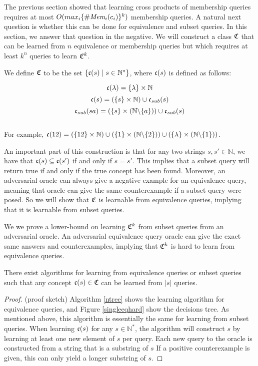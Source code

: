 The previous section showed that learning cross products of membership queries requires at most $O(max_i \{ \#\emph{Mem}_{i}(c_i) \}^k)$ membership queries. 
A natural next question is whether this can be done for equivalence and subset queries. 
In this section, we answer that question in the negative. 
We will construct a class $\mathfrak{C}$ that can be learned from $n$ equivalence or membership queries but which requires at least $k^n$ queries to learn $\mathfrak{C}^k$.  

We define $\mathfrak{C}$ to be the set $\{ \mathfrak{c}(s) \mid s \in \mathbb{N}^* \}$, where $\mathfrak{c}(s)$ is defined as follows:

\[\mathfrak{c}(\lambda) = \{\lambda\} \times \mathbb{N}\]
\[\mathfrak{c}(s) = (\{s\} \times \mathbb{N}) \cup \mathfrak{c}_{sub}(s)\]
\[\mathfrak{c}_{sub}(sa) = (\{s\} \times (\mathbb{N} \backslash \{a\})) \cup \mathfrak{c}_{sub}(s)\]\\

For example, $\mathfrak{c}(12) = (\{12\} \times \mathbb{N}) \cup (\{1\}\times(\mathbb{N} \backslash \{2\}))\cup(\{\lambda\} \times (\mathbb{N} \backslash \{1\}))$.


An important part of this construction is that for any two strings $s,s' \in \mathbb{N}$, we have that $\mathfrak{c}(s) \subseteq \mathfrak{c}(s')$ if and only if $s = s'$. 
This implies that a subset query will return true if and only if the true concept has been found. 
Moreover, an adversarial oracle can always give a negative example for an equivalence query, meaning that oracle can give the same counterexample if a subset query were posed. 
So we will show that $\mathfrak{C}$ is learnable from equivalence queries, implying that it is learnable from subset queries. 

We we prove a lower-bound on learning $\mathfrak{C}^k$ from subset queries from an adversarial oracle. 
An adversarial equivalence query oracle can give the exact same answers and counterexamples, implying that  $\mathfrak{C}^k$ is hard to learn from equivalence queries. 

\begin{proposition}
There exist algorithms for learning from equivalence queries or subset queries such that any concept $\mathfrak{c}(s) \in \mathfrak{C}$ can be learned from $|s|$ queries. 
\end{proposition}
\begin{proof}
(proof sketch) Algorithm \ref{ntree} shows the learning algorithm for equivalence queries, and Figure \ref{singleeqhard} show the decisions tree.  
As mentioned above, this algorithm is essentially the same for learning from subset queries. 
When learning $\mathfrak{c}(s)$ for any $s \in \mathbb{N}^*$, the algorithm will construct $s$ by learning at least one new element of $s$ per query. 
Each new query to the oracle is constructed from a string that is a substring of $s$
If a positive counterexample is given, this can only yield a longer substring of $s$.
\end{proof}


